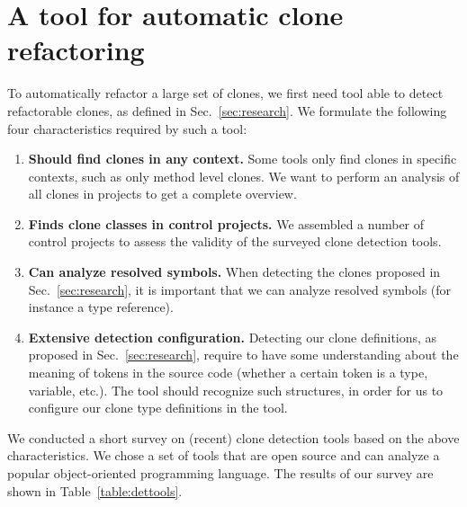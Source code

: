 \documentclass[sigconf,review,anonymous]{acmart}
\begin{document}
\section{A tool for automatic clone refactoring}\label{sec:clonerefactor}
To automatically refactor a large set of clones, we first need tool able to detect refactorable clones, as defined in Sec.~\ref{sec:research}.  We formulate the following four characteristics required by such a tool:
\begin{enumerate}
    \item \textbf{Should find clones in any context.} Some tools only find clones in specific contexts, such as only method level clones. We want to perform an analysis of all clones in projects to get a complete overview.
\item \textbf{Finds clone classes in control projects.} We assembled a number of control projects to assess the validity of the surveyed clone detection tools.
\item \textbf{Can analyze resolved symbols.} When detecting the clones proposed in Sec.~\ref{sec:research}, it is important that we can analyze resolved symbols (for instance a type reference).
\item \textbf{Extensive detection configuration.} Detecting our clone definitions, as proposed in Sec.~\ref{sec:research}, require to have some understanding about the meaning of tokens in the source code (whether a certain token is a type, variable, etc.). The tool should recognize such structures, in order for us to configure our clone type definitions in the tool.
\end{enumerate}

We conducted a short survey on (recent) clone detection tools based on the above characteristics. We chose a set of tools that are open source and can analyze a popular object-oriented programming language. The results of our survey are shown in Table~\ref{table:dettools}. 
\end{document}
